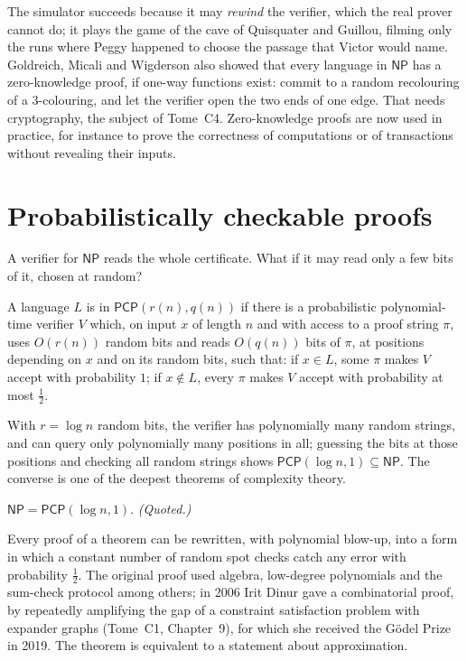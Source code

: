 The simulator succeeds because it may \emph{rewind} the verifier, which the real prover cannot do; it plays the game of the cave of Quisquater and Guillou, filming only the runs where Peggy happened to choose the passage that Victor would name. Goldreich, Micali and Wigderson also showed that every language in $\mathsf{NP}$ has a zero-knowledge proof, if one-way functions exist: commit to a random recolouring of a $3$-colouring, and let the verifier open the two ends of one edge. That needs cryptography, the subject of Tome~C4. Zero-knowledge proofs are now used in practice, for instance to prove the correctness of computations or of transactions without revealing their inputs.

\section{Probabilistically checkable proofs}\label{sec:pcpthm}

A verifier for $\mathsf{NP}$ reads the whole certificate. What if it may read only a few bits of it, chosen at random?

\begin{definition}\label{def:pcpclass}
A language $L$ is in $\mathsf{PCP}(r(n),q(n))$ if there is a probabilistic polynomial-time verifier $V$ which, on input $x$ of length $n$ and with access to a proof string $\pi$, uses $O(r(n))$ random bits and reads $O(q(n))$ bits of $\pi$, at positions depending on $x$ and on its random bits, such that: if $x\in L$, some $\pi$ makes $V$ accept with probability $1$; if $x\notin L$, every $\pi$ makes $V$ accept with probability at most $\frac12$.
\end{definition}

With $r=\log n$ random bits, the verifier has polynomially many random strings, and can query only polynomially many positions in all; guessing the bits at those positions and checking all random strings shows $\mathsf{PCP}(\log n,1)\subseteq\mathsf{NP}$. The converse is one of the deepest theorems of complexity theory.

\begin{theorem}\label{thm:pcpthm}
$\mathsf{NP}=\mathsf{PCP}(\log n,1)$. \emph{(Quoted.)}
\end{theorem}

Every proof of a theorem can be rewritten, with polynomial blow-up, into a form in which a constant number of random spot checks catch any error with probability $\frac12$. The original proof used algebra, low-degree polynomials and the sum-check protocol among others; in 2006 Irit Dinur gave a combinatorial proof, by repeatedly amplifying the gap of a constraint satisfaction problem with expander graphs (Tome~C1, Chapter~9), for which she received the Gödel Prize in 2019. The theorem is equivalent to a statement about approximation.

